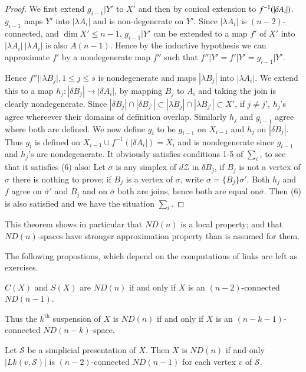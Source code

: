 \begin{proof}
We first extend $g_{i-1}|Y'$ to $X'$ and then by conical extension to $f^{-1}\break(|\delta A_{i}|)$. $g_{i-1}$ maps $Y'$ into $|\lambda A_{i}|$ and is non-degenerate on $Y'$. Since $|\lambda A_{i}|$ is $(n-2)$-connected, and $\dim X'\leq n-1$, $g_{i-1}|Y'$ can be extended to a map $f'$ of $X'$ into $|\lambda A_{i}|~|\lambda A_{i}|$ is also $A(n-1)$. Hence by the inductive hypothesis we can approximate $f'$ by a nondegenerate map $f''$ such that $f''|Y'=f'|Y'=g_{i-1}|Y'$. 

Hence $f''||\lambda B_{j}|,1\leq j\leq s$ is nondegenerate and maps $|\lambda B_{j}|$ into $|\lambda A_{i}|$. We extend this to a map $h_{j}:|\delta B_{j}|\to |\delta A_{i}|$, by mapping $B_{j}$ to $A_{i}$ and taking the join is clearly nondegenerate. Since $|\delta B_{j}|\cap |\delta B_{j'}|\subset |\lambda B_{j}|\cap |\lambda B_{j'}|\subset X'$, if $j\neq j'$, $h_{j}$'s agree whereever their domains of definition overlap. Similarly $h_{j}$ and $g_{i-1}$ agree where both are defined. We now define $g_{i}$ to be $g_{i-1}$ on $X_{i-1}$ and $h_{j}$ on $|\delta B_{j}|$. Thus $g_{i}$ is defined on $X_{i-1}\cup f^{-1}(|\delta A_{i}|)=X_{i}$ and is nondegenerate since $g_{i-1}$ and $h_{j}$'s are nondegenerate. It obviously satisfies conditions 1-5 of $\sum_{i}$, to see that it satisfies (6) also: Let $\sigma$ is any simplex of $d\mathscr{Z}$ in $\delta B_{j}$, if $B_{j}$ is not a vertex of $\sigma$ there is nothing to prove; if $B_{j}$ is a vertex of $\sigma$, write $\sigma=\{B_{j}\}\sigma'$. Both $h_{j}$ and $f$ agree on $\overline{\sigma}'$ and $B_{j}$ and on $\overline{\sigma}$ both are joins, hence both are equal on\pageoriginale $\overline{\sigma}$. Then (6) is also satisfied and we have the situation $\sum_{i}$.  
\end{proof}

This theorem shows in particular that $ND(n)$ is a local property; and that $ND(n)$-spaces have stronger approximation property than is assumed for them.

The following propostions, which depend on the computations of links are left as exercises.

\begin{exprop}\label{chap5-exprop5.3.8}
$C(X)$ and $S(X)$ are $ND(n)$ if and only if $X$ is an $(n-2)$-connected $ND(n-1)$.
\end{exprop}

Thus the $k^{\text{th}}$ suspension of $X$ is $ND(n)$ if and only if $X$ is an $(n-k-1)$-connected $ND(n-k)$-space.

\begin{exprop}\label{chap5-exprop5.3.9}
Let $\mathscr{S}$ be a simplicial presentation of $X$. Then $X$ is $ND(n)$ if and only $|Lk(v,\mathscr{S})|$ is $(n-2)$-connected $ND(n-1)$ for each vertex $v$ of $\mathscr{S}$.
\end{exprop}

